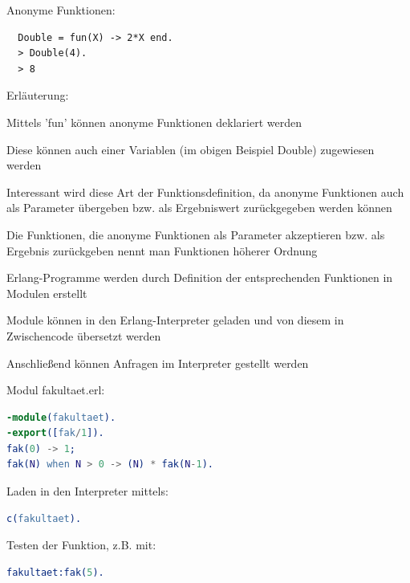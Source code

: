 \documentclass[10pt]{article}
\begin{document}
Anonyme Funktionen:
\begin{lstlisting}
  Double = fun(X) -> 2*X end.
  > Double(4).
  > 8
\end{lstlisting}
\begin{itemize*}
  \item Erläuterung:
  \item Mittels 'fun' können anonyme Funktionen deklariert werden
  \item Diese können auch einer Variablen (im obigen Beispiel Double) zugewiesen werden
  \item Interessant wird diese Art der Funktionsdefinition, da anonyme Funktionen auch als Parameter übergeben bzw. als Ergebniswert zurückgegeben werden können
  \item Die Funktionen, die anonyme Funktionen als Parameter akzeptieren bzw. als Ergebnis zurückgeben nennt man Funktionen höherer Ordnung
\end{itemize*}

\begin{itemize*}
  \item Erlang-Programme werden durch Definition der entsprechenden Funktionen in Modulen erstellt
  \item Module können in den Erlang-Interpreter geladen und von diesem in Zwischencode übersetzt werden
  \item Anschließend können Anfragen im Interpreter gestellt werden
\end{itemize*}

Modul fakultaet.erl:
\begin{lstlisting}[language=erlang]
-module(fakultaet).
-export([fak/1]).
fak(0) -> 1;
fak(N) when N > 0 -> (N) * fak(N-1).
\end{lstlisting}
Laden in den Interpreter mittels:
\begin{lstlisting}[language=erlang] 
c(fakultaet).
\end{lstlisting}
Testen der Funktion, z.B. mit:
\begin{lstlisting}[language=erlang]
fakultaet:fak(5).
\end{lstlisting}
\end{document}
